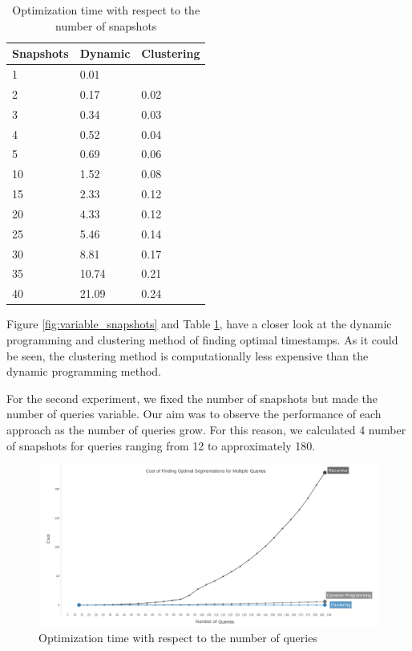 \begin{center}
\begin{table}
	\centering
	\caption{Optimization time with respect to the number of snapshots}
	\label {table:variable_snapshots_2}
	\begin{tabular}{p{2cm}p{3cm}p{3cm}}
		\hline
		Snapshots  & Dynamic  & Clustering \\ \hline
		1 &   0.01  \\  
		2 &  0.17  & 0.02  \\
		3 &  0.34  & 0.03  \\
		4 & 0.52  & 0.04  \\
		5 &  0.69  & 0.06 \\
		10 &  1.52  & 0.08  \\
		15 & 2.33  & 0.12  \\ 
		20 & 4.33  & 0.12  \\ 
		25 & 5.46  & 0.14  \\ 
		30 & 8.81  & 0.17  \\
		35 & 10.74  & 0.21  \\
		40 & 21.09  & 0.24  \\\hline
	\end{tabular}
\end{table}
\end{center}
Figure \ref{fig:variable_snapshots} and Table \ref{table:variable_snapshots_2}, have a closer look at the dynamic programming and clustering method of finding optimal timestamps. As it could be seen, the clustering method is computationally less expensive than the dynamic programming method.

For the second experiment, we fixed the number of snapshots but made the number of queries variable. Our aim was to observe the performance of each approach as the number of queries grow. For this reason, we calculated 4 number of snapshots for queries ranging from 12 to approximately 180. 

\begin{figure}
	\label{fig:variable_queries}
	\centering
	\includegraphics[width=\textwidth]{figs/multi_query.jpg}
	\caption{Optimization time with respect to the number of queries}
\end{figure} 


